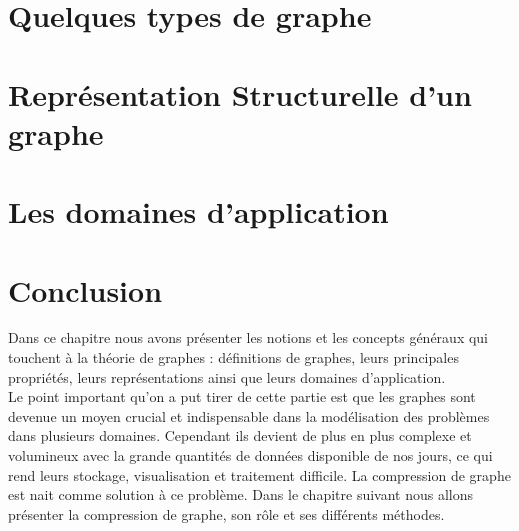	\section{Quelques types de graphe}
			
	
	
    		
    	\section{Représentation Structurelle d'un graphe}	
		
	
	\section{Les domaines d'application}
			
		
	
	
			
	\section{Conclusion}
Dans ce chapitre nous avons présenter les notions et les concepts généraux qui touchent à la théorie de graphes : définitions de graphes, leurs principales propriétés, leurs représentations ainsi que leurs domaines d'application.\\
Le point important qu'on a put tirer de cette partie est que les graphes sont devenue un moyen crucial et indispensable dans la modélisation des problèmes dans plusieurs domaines. Cependant ils devient de plus en plus complexe et volumineux avec la grande quantités de données disponible de nos jours, ce qui rend leurs stockage, visualisation et traitement difficile. La compression de graphe est nait comme solution à ce problème. Dans le chapitre suivant nous allons présenter la compression de graphe, son rôle et ses différents méthodes.  
	
	